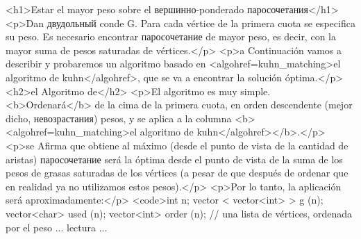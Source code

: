 <h1>Estar el mayor peso sobre el вершинно-ponderado паросочетания</h1>
<p>Dan двудольный conde G. Para cada vértice de la primera cuota se especifica su peso. Es necesario encontrar паросочетание de mayor peso, es decir, con la mayor suma de pesos saturadas de vértices.</p>
<p>a Continuación vamos a describir y probaremos un algoritmo basado en <algohref=kuhn_matching>el algoritmo de kuhn</algohref>, que se va a encontrar la solución óptima.</p>
<h2>el Algoritmo de</h2>
<p>El algoritmo es muy simple. <b>Ordenará</b> de la cima de la primera cuota, en orden descendente (mejor dicho, невозрастания) pesos, y se aplica a la columna <b><algohref=kuhn_matching>el algoritmo de kuhn</algohref></b>.</p>
<p>se Afirma que obtiene al máximo (desde el punto de vista de la cantidad de aristas) паросочетание será la óptima desde el punto de vista de la suma de los pesos de grasas saturadas de los vértices (a pesar de que después de ordenar que en realidad ya no utilizamos estos pesos).</p>
<p>Por lo tanto, la aplicación será aproximadamente:</p>
<code>int n;
vector < vector<int> > g (n);
vector<char> used (n);
vector<int> order (n); // una lista de vértices, ordenada por el peso
... lectura ...

